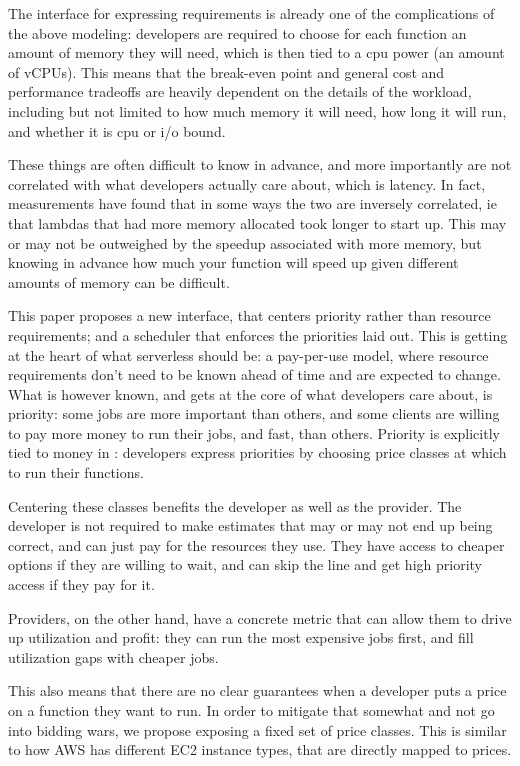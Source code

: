 The interface for expressing requirements is already one of the complications of
the above modeling: developers are required to choose for each function an
amount of memory they will need, which is then tied to a cpu power (an amount of
vCPUs). This means that the break-even point and general cost and performance
tradeoffs are heavily dependent on the details of the workload, including but
not limited to how much memory it will need, how long it will run, and whether
it is cpu or i/o bound. 

These things are often difficult to know in advance, and more importantly are
not correlated with what developers actually care about, which is latency. In
fact, measurements have found that in some ways the two are inversely
correlated, ie that lambdas that had more memory allocated took longer to start
up. 
This may or may not be outweighed by the speedup associated with more memory,
but knowing in advance how much your function will speed up given different
amounts of memory can be difficult.



This paper proposes a new interface, that centers priority rather than resource
requirements; and a scheduler \sys{} that enforces the priorities laid out. This
is getting at the heart of what serverless should be: a pay-per-use model, where
resource requirements don't need to be known ahead of time and are expected to
change. What is however known, and gets at the core of what developers care
about, is priority: some jobs are more important than others, and some clients
are willing to pay more money to run their jobs, and fast, than others. Priority
is explicitly tied to money in \sys{}: developers express priorities by choosing
price classes at which to run their functions.

Centering these classes benefits the developer as well as the provider. The
developer is not required to make estimates that may or may not end up being
correct, and can just pay for the resources they use. They have access to
cheaper options if they are willing to wait, and can skip the line and get high
priority access if they pay for it.

Providers, on the other hand, have a concrete metric that can allow them to
drive up utilization and profit: they can run the most expensive jobs first, and
fill utilization gaps with cheaper jobs. 

This also means that there are no clear guarantees when a developer puts a price
on a function they want to run. In order to mitigate that somewhat and not go
into bidding wars, we propose exposing a fixed set of price classes. This is
similar to how AWS has different EC2 instance types, that are directly mapped to
prices. 

